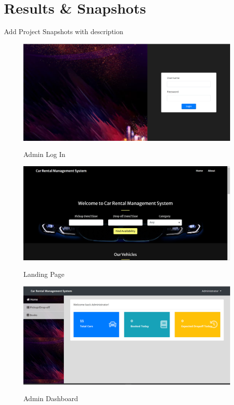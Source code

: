\chapter{Results \& Snapshots}
Add Project Snapshots with description
\begin{figure}[H]
\centering
\caption{Admin Log In}
\includegraphics[width=\textwidth,height=\textheight,keepaspectratio]{admin-login.png}
\\[0.2in]
\label{fig:Login Form}
\end{figure}

\begin{figure}[H]
\centering
\caption{Landing Page}
\includegraphics[width=\textwidth,height=\textheight,keepaspectratio]{landing page.png}
\\[0.2in]
\label{fig:Index Page}
\end{figure}
\begin{figure}[H]
\centering
\caption{Admin Dashboard}
\includegraphics[width=\textwidth,height=\textheight,keepaspectratio]{admin dashboard.png}
\\[0.2in]
\label{fig:Teacher Details}
\end{figure}

